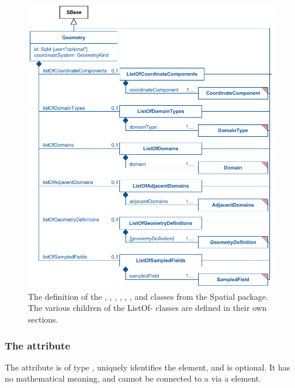 \begin{figure}[ht]
  \includegraphics{figs/Geometry-uml}
  \caption{The definition of the \Geometry, \ListOfCoordinateComponents, \ListOfDomainTypes, \ListOfDomains, \ListOfAdjacentDomains, \ListOfGeometryDefinitions, and \ListOfSampledFields classes from the Spatial package.  The various children of the ListOf- classes are defined in their own sections.}
  \label{Geometry-uml}
  \label{ListOfCoordinateComponents-uml}
  \label{ListOfDomainTypes-uml}
  \label{ListOfDomains-uml}
  \label{ListOfAdjacentDomains-uml}
  \label{ListOfGeometryDefinitions-uml}
  \label{ListOfSampledFields-uml}
\end{figure}

\subsubsection{The \fixttspace{} attribute}
The  attribute is of type , uniquely identifies the \Geometry element, and is optional.  It has no mathematical meaning, and cannot be connected to a \Parameter via a \SpatialSymbolReference element.


